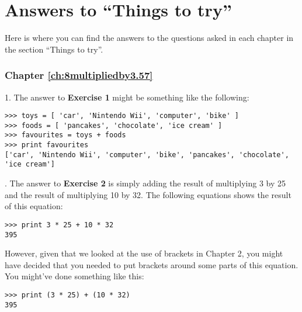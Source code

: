 

\chapter{Answers to ``Things to try''}\label{app:answers}

Here is where you can find the answers to the questions asked in each chapter in the section ``Things to try''.

\subsection*{Chapter \ref{ch:8multipliedby3.57}}

1. The answer to \textbf{Exercise 1} might be something like the following:

\begin{listing}
\begin{verbatim}
>>> toys = [ 'car', 'Nintendo Wii', 'computer', 'bike' ]
>>> foods = [ 'pancakes', 'chocolate', 'ice cream' ]
>>> favourites = toys + foods
>>> print favourites
['car', 'Nintendo Wii', 'computer', 'bike', 'pancakes', 'chocolate', 'ice cream']
\end{verbatim}
\end{listing}

.  The answer to \textbf{Exercise 2} is simply adding the result of multiplying 3 by 25 and the result of multiplying 10 by 32.  The following equations shows the result of this equation:

\begin{listing}
\begin{verbatim}
>>> print 3 * 25 + 10 * 32
395
\end{verbatim}
\end{listing}

\noindent
However, given that we looked at the use of brackets in Chapter 2, you might have decided that you needed to put brackets around some parts of this equation.  You might've done something like this:

\begin{listing}
\begin{verbatim}
>>> print (3 * 25) + (10 * 32)
395
\end{verbatim}
\end{listing}


